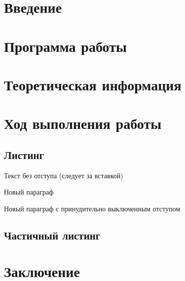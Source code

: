








\section*{Введение}


\section{Программа работы}


\section{Теоретическая информация}


\section{Ход выполнения работы}

\subsection{Листинг}


\parindent=1cm %
Текст без отступа (следует за вставкой)

Новый параграф

\noindent Новый параграф с принудительно выключенным отступом


\subsection{Частичный листинг}
\makeatletter
\def\lst@PlaceNumber{\llap{\normalfont
                \lst@numberstyle{\the\lst@lineno}\kern\lst@numbersep}}
\makeatother


\parindent=1cm

\section*{Заключение}


\renewcommand\refname{Список использованных источников}



